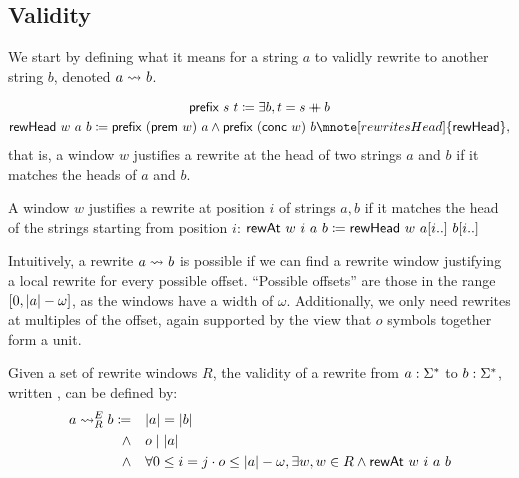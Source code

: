 \subsection{Validity}
We start by defining what it means for a string $a$ to validly rewrite to another string $b$, denoted $a \rightsquigarrow_{} b$.
\begin{definition}\label{def:rewHead}
  \begin{gather*}
    \prefix{s}{t} \defeq \exists b, t = s \concat{} b\\
    \rewHead{w}{a}{b} \defeq \prefix{(\prem{w})}{a} \land \prefix{(\conc{w})}{b}  \mnote[rewritesHead]{\textsf{rewHead}},
  \end{gather*}
  that is, a window $w$ justifies a rewrite at the head of two strings $a$ and $b$ if it matches the heads of $a$ and $b$.

  A window $w$ justifies a rewrite at position $i$ of strings $a, b$ if it matches the head of the strings starting from position $i$:
  $\textsf{rewAt}~w~i~a~b \coloneqq \textsf{rewHead}~w~a[i..]~b[i..]$
\end{definition}

Intuitively, a rewrite $a \rightsquigarrow_{} b$ is possible if we can find a rewrite window justifying a local rewrite for every possible offset. ``Possible offsets'' are those in the range $[0, |a| - \omega]$, as the windows have a width of $\omega$. Additionally, we only need rewrites at multiples of the offset, again supported by the view that $o$ symbols together form a unit.

\begin{definition}\label{def:valid_exp}
  Given a set of rewrite windows $R$, the validity of a rewrite from $a : \Sigma^*$ to $b : \Sigma^*$, written , can be defined by:
  \begin{align*}
    a \rightsquigarrow_{R}^E b \coloneqq \quad& |a| = |b| \\
    \land \quad & o \mid |a| \\
    \land \quad & \forall 0 \le i = j \cdot o \le |a| - \omega, \exists w, w \in R \land \textsf{rewAt}~w~i~a~b 
  \end{align*}
\end{definition}

